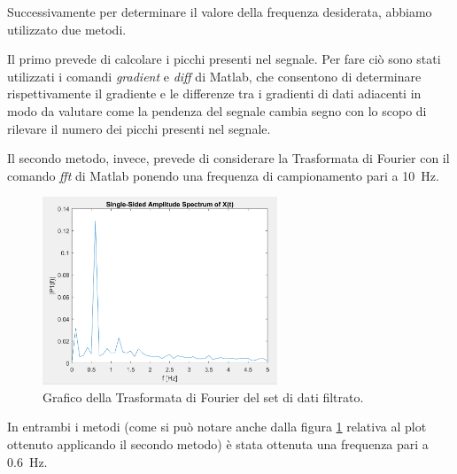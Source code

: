 Successivamente per determinare il valore della frequenza desiderata, abbiamo utilizzato due metodi.

Il primo prevede di calcolare i picchi presenti nel segnale. Per fare ciò sono stati utilizzati i comandi \textit{gradient} e \textit{diff} di Matlab, che consentono di determinare rispettivamente il gradiente e le differenze tra i gradienti di dati adiacenti in modo da valutare come la pendenza del segnale cambia segno con lo scopo di rilevare il numero dei picchi presenti nel segnale.

Il secondo metodo, invece, prevede di considerare la Trasformata di Fourier con il comando \textit{fft} di Matlab ponendo una frequenza di campionamento pari a \SI{10}{\hertz}.
\begin{figure}[tbh]
	\centering		\includegraphics[width=7cm]{./ImageFiles/plot2_arr2.png}
	\caption{Grafico della Trasformata di Fourier del set di dati filtrato.}
	\label{fig:plot_fft}
\end{figure}

In entrambi i metodi (come si può notare anche dalla figura \ref{fig:plot_fft} relativa al plot ottenuto applicando il secondo metodo) è stata ottenuta una frequenza pari a \SI{0.6}{\hertz}.